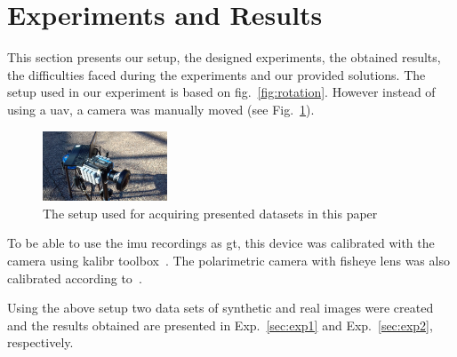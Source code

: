 \graphicspath{{./content/experiments/figures/}}

\section{Experiments and Results}
\label{sec:exp-res}
This section presents our setup, the designed experiments, the obtained
results, the difficulties faced during the experiments and our provided
solutions.
The setup used in our experiment is based on fig.~\ref{fig:rotation}.
However instead of using a \gls{uav}, a camera was manually moved (see
Fig.~\ref{fig:setup}).
\begin{figure}
  \centering
\includegraphics[width=0.33\textwidth]{./content/experiments/figures/setup.jpg}
\caption{The setup used for acquiring presented datasets in this paper}
\label{fig:setup}
\end{figure}
To be able to use the \gls{imu} recordings as \gls{gt}, this device
was calibrated with the camera using kalibr toolbox~\cite{furgale2013unified,
  furgale2012continuous}. The polarimetric camera with fisheye lens was also
calibrated according to~\cite{kannala2006generic}.

Using the above setup two data sets of synthetic and real images were created
and the results obtained are presented in Exp.~\ref{sec:exp1} and
Exp.~\ref{sec:exp2}, respectively.


